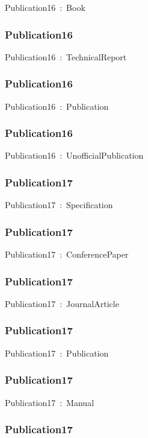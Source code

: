 \documentclass{article}
\begin{document}
Publication16~:~Book

\subsubsection*{Publication16}

Publication16~:~TechnicalReport

\subsubsection*{Publication16}

Publication16~:~Publication

\subsubsection*{Publication16}

Publication16~:~UnofficialPublication

\subsubsection*{Publication17}

Publication17~:~Specification

\subsubsection*{Publication17}

Publication17~:~ConferencePaper

\subsubsection*{Publication17}

Publication17~:~JournalArticle

\subsubsection*{Publication17}

Publication17~:~Publication

\subsubsection*{Publication17}

Publication17~:~Manual

\subsubsection*{Publication17}
\end{document}
